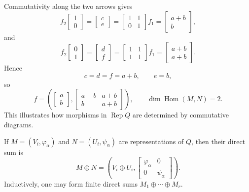 \documentclass[11pt, a4paper]{report}
\begin{document}
\begin{example}
    Commutativity along the two arrows gives
    \[
        f_2\begin{bmatrix}1\\0\end{bmatrix}
        =
        \begin{bmatrix}c\\e\end{bmatrix}
        =
        \begin{bmatrix}1&1\\0&1\end{bmatrix}
        f_1
        =
        \begin{bmatrix}a+b\\b\end{bmatrix},
    \]
    and
    \[
        f_2\begin{bmatrix}0\\1\end{bmatrix}
        =
        \begin{bmatrix}d\\f\end{bmatrix}
        =
        \begin{bmatrix}1&1\\1&1\end{bmatrix}
        f_1
        =
        \begin{bmatrix}a+b\\a+b\end{bmatrix}.
    \]
    Hence
    \[
        c=d=f=a+b,
        \qquad
        e=b,
    \]
    so
    \[
        f=
        \left(
        \begin{bmatrix}a\\b\end{bmatrix},
        \begin{bmatrix}a+b&a+b\\b&a+b\end{bmatrix}
        \right),
        \qquad
        \dim \operatorname{Hom}(M,N)=2.
    \]
    This illustrates how morphisms in $\operatorname{Rep}Q$ are determined by commutative diagrams.
\end{example}

\begin{definition}
    If $M=(V_i,\varphi_\alpha)$ and $N=(U_i,\psi_\alpha)$ are representations of $Q$, then their direct sum is
    \[
        M \oplus N=
        \left(
        V_i \oplus U_i,
        \begin{bmatrix}
                \varphi_\alpha & 0           \\
                0              & \psi_\alpha
            \end{bmatrix}
        \right).
    \]
    Inductively, one may form finite direct sums $M_1 \oplus \cdots \oplus M_r$.
\end{definition}
\end{document}
